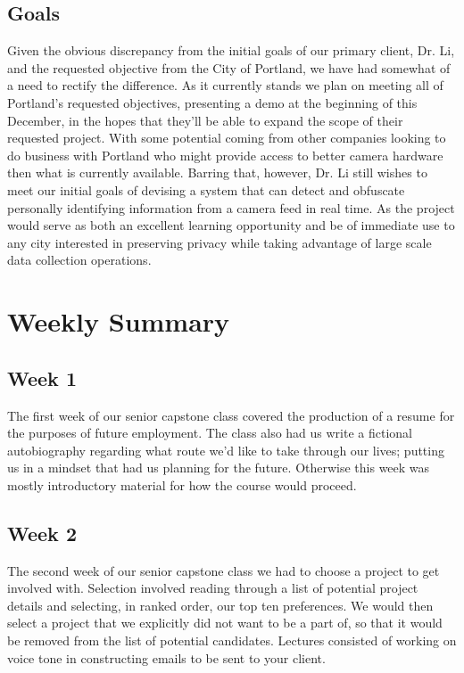 \subsection{Goals}
Given the obvious discrepancy from the initial goals of our primary client, Dr. Li, and the requested objective from the City of Portland, we have had somewhat of a need to rectify the difference. As it currently stands we plan on meeting all of Portland’s requested objectives, presenting a demo at the beginning of this December, in the hopes that they’ll be able to expand the scope of their requested project. With some potential coming from other companies looking to do business with Portland who might provide access to better camera hardware then what is currently available. Barring that, however, Dr. Li still wishes to meet our initial goals of devising a system that can detect and obfuscate personally identifying information from a camera feed in real time. As the project would serve as both an excellent learning opportunity and be of immediate use to any city interested in preserving privacy while taking advantage of large scale data collection operations.

\section{Weekly Summary}
\subsection{Week 1}
The first week of our senior capstone class covered the production of a resume for the purposes of future employment. The class also had us write a fictional autobiography regarding what route we’d like to take through our lives; putting us in a mindset that had us planning for the future. Otherwise this week was mostly introductory material for how the course would proceed.

\subsection{Week 2}
The second week of our senior capstone class we had to choose a project to get involved with. Selection involved reading through a list of potential project details and selecting, in ranked order, our top ten preferences. We would then select a project that we explicitly did not want to be a part of, so that it would be removed from the list of potential candidates. Lectures consisted of working on voice tone in constructing emails to be sent to your client.

